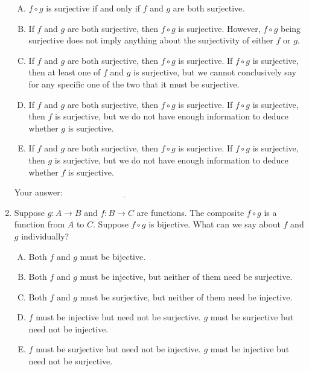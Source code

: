 \documentclass[10pt]{amsart}
\begin{document}
\begin{enumerate}
  \begin{enumerate}[(A)]
  \item $f \circ g$ is surjective if and only if $f$ and $g$ are both
    surjective.
  \item If $f$ and $g$ are both surjective, then $f \circ g$ is
    surjective. However, $f \circ g$ being surjective does not imply
    anything about the surjectivity of either $f$ or $g$.
  \item If $f$ and $g$ are both surjective, then $f \circ g$ is
    surjective. If $f \circ g$ is surjective, then at least one of $f$
    and $g$ is surjective, but we cannot conclusively say for any
    specific one of the two that it must be surjective.
  \item If $f$ and $g$ are both surjective, then $f \circ g$ is
    surjective. If $f \circ g$ is surjective, then $f$ is surjective,
    but we do not have enough information to deduce whether $g$ is
    surjective.
  \item If $f$ and $g$ are both surjective, then $f \circ g$ is
    surjective. If $f \circ g$ is surjective, then $g$ is surjective,
    but we do not have enough information to deduce whether $f$ is surjective.
  \end{enumerate}

  \vspace{0.1in}
  Your answer: $\underline{\qquad\qquad\qquad\qquad\qquad\qquad\qquad}$
  \vspace{0.1in}

\item Suppose $g:A \to B$ and $f:B \to C$ are functions. The composite
  $f \circ g$ is a function from $A$ to $C$. Suppose $f \circ g$ is
  bijective. What can we say about $f$ and $g$ individually?

  \begin{enumerate}[(A)]
  \item Both $f$ and $g$ must be bijective.
  \item Both $f$ and $g$ must be injective, but neither of them need be surjective.
  \item Both $f$ and $g$ must be surjective, but neither of them need be injective.
  \item $f$ must be injective but need not be surjective. $g$ must be
    surjective but need not be injective.
  \item $f$ must be surjective but need not be injective. $g$ must be
    injective but need not be surjective.
  \end{enumerate}


\end{enumerate}
\end{document}
